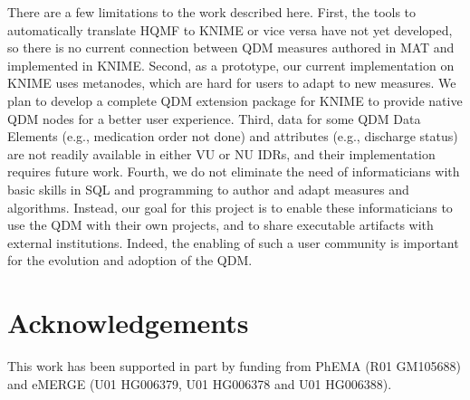 \documentclass{article}
\begin{document}
There are a few limitations to the work described here. First, the tools to automatically translate HQMF to KNIME or vice versa have not yet developed, so there is no current connection between QDM measures authored in MAT and implemented in KNIME. Second, as a prototype, our current implementation on KNIME uses metanodes, which are hard for users to adapt to new measures. We plan to develop a complete QDM extension package for KNIME to provide native QDM nodes for a better user experience. Third, data for some QDM Data Elements (e.g., medication order not done) and attributes (e.g., discharge status) are not readily available in either VU or NU IDRs, and their implementation requires future work. Fourth, we do not eliminate the need of informaticians with basic skills in SQL and programming to author and adapt measures and algorithms. Instead, our goal for this project is to enable these informaticians to use the QDM with their own projects, and to share executable artifacts with external institutions. Indeed, the enabling of such a user community is important for the evolution and adoption of the QDM.

\section{Acknowledgements}

This work has been supported in part by funding from PhEMA (R01 GM105688) and eMERGE (U01 HG006379, U01 HG006378 and U01 HG006388).

\centering


\end{document}
